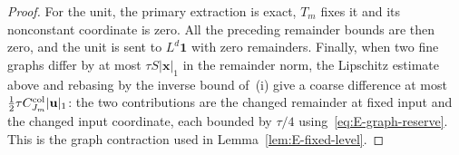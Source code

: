 \begin{proof}
For the unit, the primary extraction is exact, $T_m$ fixes it and its nonconstant coordinate is zero. All the preceding remainder bounds are then zero, and the unit is sent to $L^d\mathbf1$ with zero remainders. Finally, when two fine graphs differ by at most $\tau S|\mathbf x|_1$ in the remainder norm, the Lipschitz estimate above and rebasing by the inverse bound of~(i) give a coarse difference at most $\tfrac12\tau C^{\rm col}_{J_m}|\mathbf u|_1$: the two contributions are the changed remainder at fixed input and the changed input coordinate, each bounded by $\tau/4$ using~\eqref{eq:E-graph-reserve}. This is the graph contraction used in Lemma~\ref{lem:E-fixed-level}.
\end{proof}
